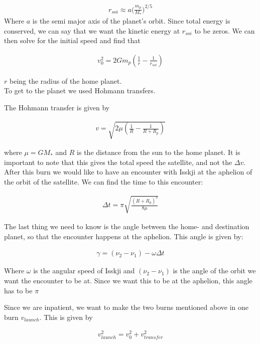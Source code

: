 \documentclass[a4paper, 10pt]{article}
\begin{document}
\begin{align}
r_{soi} \approx a \big( \frac{m_p}{M_*} \big) ^{2/5}
\end{align}
Where $a$ is the semi major axis of the planet's orbit. Since total energy is conserved, we can say that we want the kinetic energy at $r_{soi}$ to be zeros. We can then solve for the initial speed and find that 

\begin{align}
v_{0}^2 = 2Gm_p \left( \frac{1}{r} - \frac{1}{r_{soi}} \right) 
\end{align}

$r$ being the radius of the home planet. \\

To get to the planet we used Hohmann transfers\cite{SpaceDynamics}.

The Hohmann transfer is given by

\begin{align}
v = \sqrt{2\mu \left( \frac{1}{R} - \frac{1}{R + R_p} \right)}
\end{align}

where $\mu = GM_*$ and $R$ is the distance from the sun to the home planet. It is important to note that this gives the total speed the satellite, and not the $\Delta v$. \\

After this burn we would like to have an encounter with Isskji at the aphelion of the orbit of the satellite. We can find the time to this encounter:

\begin{align}
\Delta t = \pi \sqrt{\frac{(R +R_p)^3}{8\mu}}
\end{align}

The last thing we need to know is the angle between the home- and destination planet, so that the encounter happens at the aphelion. This angle is given by:

\begin{align}
\gamma = (\nu_2 -\nu_1) - \omega \Delta t
\end{align}

Where $\omega$ is the angular speed of Isskji and $(\nu_2 -\nu_1)$ is the angle of the orbit we want the encounter to be at. Since we want this to be at the aphelion, this angle has to be $\pi$

Since we are inpatient, we want to make the two burns mentioned above in one burn $v_{launch}$. This is given by

\begin{align}
v_{launch}^2 = v_0^2 + v_{transfer}^2
\end{align} 
\end{document}
